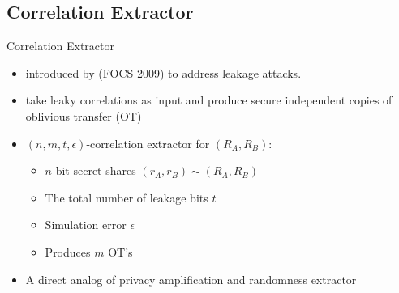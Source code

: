 \subsection{Correlation Extractor}
\begin{frame}{Correlation Extractor}
	\begin{itemize}
		\item introduced by \cite{IKOS} (FOCS 2009) to address leakage attacks. 
		\item take leaky correlations as input and produce secure independent
		copies of oblivious transfer (OT)
		\item $ (n,m,t,\epsilon) $-correlation extractor for $ (R_A, R_B) $: 
			\begin{itemize}
				\item $n$-bit secret shares $ (r_A, r_B) \sim (R_A, R_B) $ 
				\item The total number of leakage bits $ t $
				\item Simulation error $ \epsilon $
				\item Produces $ m $ OT's
			\end{itemize}
		\item A direct analog of privacy amplification and randomness extractor
	\end{itemize}
\end{frame}
	

